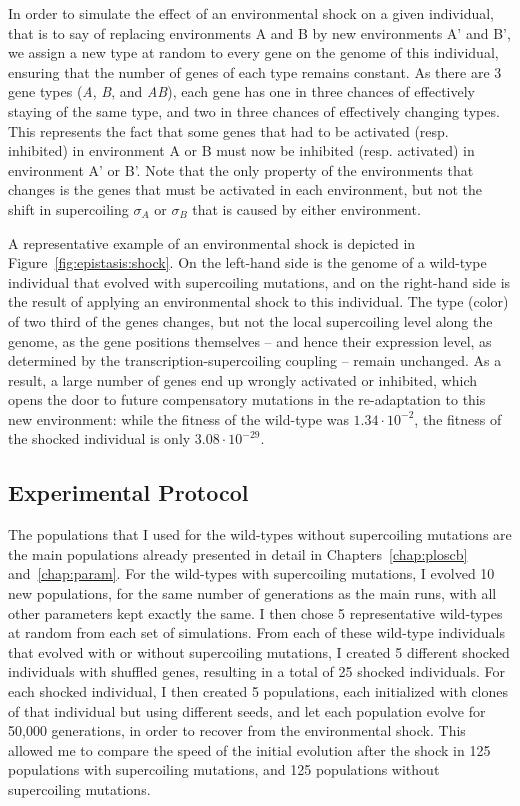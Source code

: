 In order to simulate the effect of an environmental shock on a given individual, that is to say of replacing environments A and B by new environments A' and B', we assign a new type at random to every gene on the genome of this individual, ensuring that the number of genes of each type remains constant.
As there are 3 gene types (\emph{A}, \emph{B}, and \emph{AB}), each gene has one in three chances of effectively staying of the same type, and two in three chances of effectively changing types.
This represents the fact that some genes that had to be activated (resp. inhibited) in environment A or B must now be inhibited (resp. activated) in environment A' or B'.
Note that the only property of the environments that changes is the genes that must be activated in each environment, but not the shift in supercoiling $\sigma_A$ or $\sigma_B$ that is caused by either environment.

A representative example of an environmental shock is depicted in Figure~\ref{fig:epistasis:shock}.
On the left-hand side is the genome of a wild-type individual that evolved with supercoiling mutations, and on the right-hand side is the result of applying an environmental shock to this individual.
The type (color) of two third of the genes changes, but not the local supercoiling level along the genome, as the gene positions themselves -- and hence their expression level, as determined by the transcription-supercoiling coupling -- remain unchanged.
As a result, a large number of genes end up wrongly activated or inhibited, which opens the door to future compensatory mutations in the re-adaptation to this new environment: while the fitness of the wild-type was $1.34\cdot10^{-2}$, the fitness of the shocked individual is only $3.08\cdot10^{-29}$.

\subsection{Experimental Protocol}

The populations that I used for the wild-types without supercoiling mutations are the main populations already presented in detail in Chapters~\ref{chap:ploscb} and~\ref{chap:param}.
For the wild-types with supercoiling mutations, I evolved 10 new populations, for the same number of generations as the main runs, with all other parameters kept exactly the same.
I then chose 5 representative wild-types at random from each set of simulations.
From each of these wild-type individuals that evolved with or without supercoiling mutations, I created 5 different shocked individuals with shuffled genes, resulting in a total of 25 shocked individuals.
For each shocked individual, I then created 5 populations, each initialized with clones of that individual but using different seeds, and let each population evolve for 50,000 generations, in order to recover from the environmental shock.
This allowed me to compare the speed of the initial evolution after the shock in 125 populations with supercoiling mutations, and 125 populations without supercoiling mutations.


